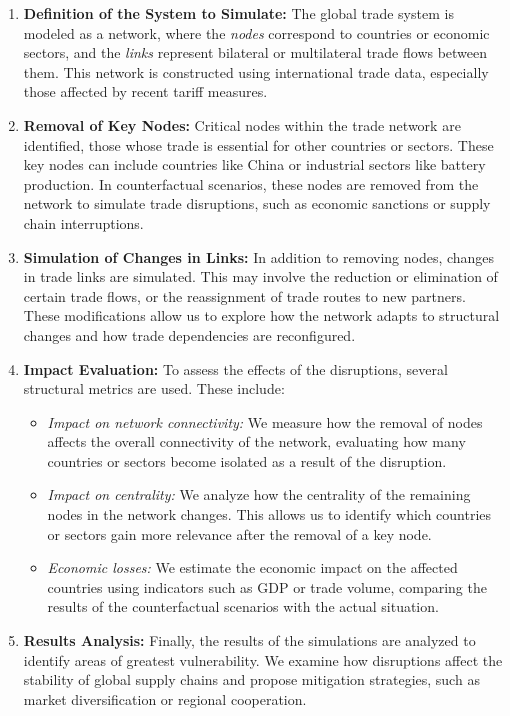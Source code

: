 \documentclass[final,1p,times,authoryear]{elsarticle}
\begin{document}
\begin{enumerate}
    \item \textbf{Definition of the System to Simulate:} The global trade system is modeled as a network, where the \textit{nodes} correspond to countries or economic sectors, and the \textit{links} represent bilateral or multilateral trade flows between them. This network is constructed using international trade data, especially those affected by recent tariff measures.

    \item \textbf{Removal of Key Nodes:} Critical nodes within the trade network are identified, those whose trade is essential for other countries or sectors. These key nodes can include countries like China or industrial sectors like battery production. In counterfactual scenarios, these nodes are removed from the network to simulate trade disruptions, such as economic sanctions or supply chain interruptions.

    \item \textbf{Simulation of Changes in Links:} In addition to removing nodes, changes in trade links are simulated. This may involve the reduction or elimination of certain trade flows, or the reassignment of trade routes to new partners. These modifications allow us to explore how the network adapts to structural changes and how trade dependencies are reconfigured.

    \item \textbf{Impact Evaluation:} To assess the effects of the disruptions, several structural metrics are used. These include:
    \begin{itemize}
        \item \textit{Impact on network connectivity:} We measure how the removal of nodes affects the overall connectivity of the network, evaluating how many countries or sectors become isolated as a result of the disruption.
        \item \textit{Impact on centrality:} We analyze how the centrality of the remaining nodes in the network changes. This allows us to identify which countries or sectors gain more relevance after the removal of a key node.
        \item \textit{Economic losses:} We estimate the economic impact on the affected countries using indicators such as GDP or trade volume, comparing the results of the counterfactual scenarios with the actual situation.
    \end{itemize}

    \item \textbf{Results Analysis:} Finally, the results of the simulations are analyzed to identify areas of greatest vulnerability. We examine how disruptions affect the stability of global supply chains and propose mitigation strategies, such as market diversification or regional cooperation.
\end{enumerate}
\end{document}
